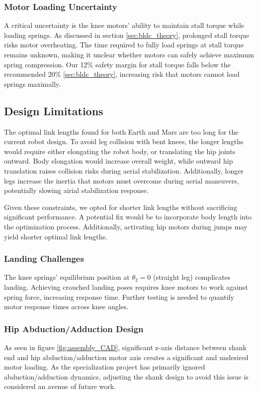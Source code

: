 \subsubsection{Motor Loading Uncertainty}
A critical uncertainty is the knee motors' ability to maintain stall torque while loading springs. As discussed in section \ref{sec:bldc_theory}, prolonged stall torque risks motor overheating. The time required to fully load springs at stall torque remains unknown, making it unclear whether motors can safely achieve maximum spring compression. Our 12\% safety margin for stall torque falls below the recommended 20\% \ref{sec:bldc_theory}, increasing risk that motors cannot load springs maximally.

\subsection{Design Limitations}

The optimal link lengths found for both Earth and Mars are too long for the current robot design. To avoid leg collision with bent knees, the longer lengths would require either elongating the robot body, or translating the hip joints outward. Body elongation would increase overall weight, while outward hip translation raises collision risks during aerial stabilization. Additionally, longer legs increase the inertia that motors must overcome during aerial maneuvers, potentially slowing airial stabilization response.

Given these constraints, we opted for shorter link lengths without sacrificing significant performance. A potential fix would be to incorporate body length into the optimization process. Additionally, activating hip motors during jumps may yield shorter optimal link lengths.
\subsubsection{Landing Challenges}
The knee springs' equilibrium position at $\theta_2=0$ (straight leg) complicates landing. Achieving crouched landing poses requires knee motors to work against spring force, increasing response time. Further testing is needed to quantify motor response times across knee angles.

\subsubsection{Hip Abduction/Adduction Design}
As seen in figure \ref{fig:assembly_CAD}, significant z-axis distance between shank end and hip abduction/adduction motor axis creates a significant and undesired motor loading. As the specialization project has primarily ignored abduction/adduction dynamics, 
adjusting the shank design to avoid this issue is considered an avenue of future work.

